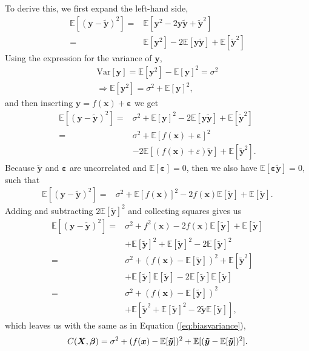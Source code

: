 \documentclass[a4paper, 10pt]{article}
\begin{document}
\begin{multicols}{2}
To derive this, we first expand the left-hand side,
\begin{align*}
\mathbb{E}[	(\bm{y}-\bm{\tilde{y}})^2] =& \mathbb{E}[\bm{y}^2  -2\bm{y}\bm{\tilde{y}}+ \bm { \tilde{y} } ^2 ] \\
=& \mathbb{E}[\bm{y}^2]  - 2\mathbb{E}[\bm{y\tilde{y}}]+\mathbb{E}[\bm{\tilde{y}}^2]
\end{align*}
Using the expression for the variance of $\bm{y}$,
\begin{align}
\text{Var}[\bm{y}] = \mathbb{E}[\bm{y}^2] - \mathbb{E}[{\bm{y}}]^2 = \sigma^2\\
\Rightarrow \mathbb{E}[\bm{y}^2] = \sigma^2 + \mathbb{E}[{\bm{y}}]^2,
\end{align}
 and then inserting $\bm{y} = f(\bm{x}) + \bm{\varepsilon}$ we get
\begin{align*}
\mathbb{E}[	(\bm{y}-\bm{\tilde{y}})^2]=& \sigma^2 +  \mathbb{E}[\bm{y}]^2  -2 \mathbb{E}[\bm{y}\bm{\tilde{y}}] +  \mathbb{E}[\bm{\tilde{y}}^2]\\
=& \sigma^2 +  \mathbb{E}[f(\bm{x}) + \bm{\varepsilon}]^2 \\&- 2 \mathbb{E} [(f(\bm{x})+\varepsilon)\bm{\tilde{y}}] +  \mathbb{E}[\bm{\tilde{y}}^2 ].
\end{align*}
Because  $\bm{\tilde{y}}$ and $\bm{\varepsilon}$ are uncorrelated and $\mathbb{E}[\bm{\varepsilon}]=0$, then we also have $\mathbb{E}[\bm{\varepsilon\tilde{y}}]=0,$ such that
\begin{align*}
\mathbb{E}[	(\bm{y}-\bm{\tilde{y}})^2]=& \sigma^2 +  \mathbb{E}[f(\bm{x})]^2 -2f(\bm{x}) \mathbb{E}[\bm{\tilde{y}}] +  \mathbb{E}[\bm{\tilde{y}}].
\end{align*}
Adding and subtracting $2\mathbb{E}[\bm{\tilde{y}}]^2$ and collecting squares gives us
\begin{align*}
\mathbb{E}[	(\bm{y}-\bm{\tilde{y}})^2]=&\sigma^2 + f^2(\bm{x})-2f(\bm{x}) \mathbb{E}[\bm{\tilde{y}}] +  \mathbb{E}[\bm{\tilde{y}}]\\&+\mathbb{E}[\bm{\tilde{y}}]^2 + \mathbb{E}[\bm{\tilde{y}}]^2 -2\mathbb{E}[\bm{\tilde{y}}]^2\\
=&  \sigma ^2  + ( f(\bm{x}) -\mathbb{E}[\bm{\tilde{y}}]  )^2 + \mathbb{E}[\bm{\tilde{y}}^2] \\&+\mathbb{E}[\bm{\tilde{y}}]\mathbb{E}[\bm{\tilde{y}}]  - 2\mathbb{E}[\bm{\tilde{y}}]\mathbb{E}[\bm{\tilde{y}}]\\
= &  \sigma^2 +  ( f(\bm{x}) -\mathbb{E}[\bm{\tilde{y}}]  )^2   \\&+ \mathbb{E}[\bm{\tilde{y}}^2 + \mathbb{E}[\bm{\tilde{y}}]^2 - 2\bm{\tilde{y}}\mathbb{E}[\bm{\tilde{y}}]],
\end{align*}
which leaves us with the same as in Equation (\ref{eq:biasvariance}),
\begin{equation*}
C(\bm{X},\bm{\beta} ) =  \sigma^2 +  ( f(\bm{x}) -\mathbb{E}[\bm{\tilde{y}}]  )^2  +\mathbb{E}[(\bm{\tilde{y}} -\mathbb{E}[\bm{\tilde{y}}])^2]. \\
\end{equation*}






\end{multicols}
\end{document}
